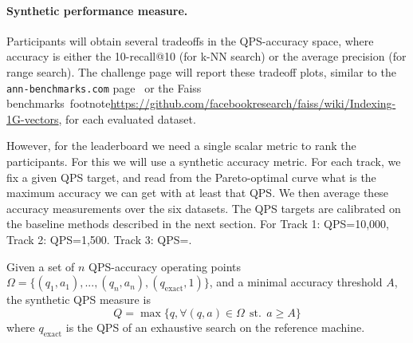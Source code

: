 \fi




\paragraph{Synthetic performance measure.}


Participants will obtain several tradeoffs in the QPS-accuracy space,
where accuracy is either the 10-recall@10 (for k-NN search) or the
average precision (for range search).  
The challenge page will report
these tradeoff plots, similar to the {\tt ann-benchmarks.com}
page~\cite{Benchmark} or the Faiss benchmarks~footnote{\url{https://github.com/facebookresearch/faiss/wiki/Indexing-1G-vectors}},
for each evaluated dataset.

However, for the leaderboard we need a single scalar metric to rank the participants. 
For this we will use a synthetic accuracy metric. 
For each track, we fix a given QPS target, and read from the Pareto-optimal curve what is the maximum accuracy we can get with at least that QPS. 
%
We then average these accuracy measurements over the six datasets. 
The QPS targets are calibrated on the baseline methods described in the next section. 
For Track 1: QPS=10,000, Track 2: QPS=1,500. Track 3: QPS=.


\iffalse 

\begin{definition}
  \label{def:syntheticmetric}
  Given a set of $n$ QPS-accuracy operating points $\Omega = \{(q_1, a_1), ..., (q_n, a_n), (q_\mathrm{exact}, 1)\}$, 
  and a minimal accuracy threshold $A$,   the synthetic QPS measure is 
  \[
Q =  \max \{ q, \forall (q, a)\in \Omega \ \ \mathrm{st.}\ \  a\ge A \}
  \]
  where $q_\mathrm{exact}$ is the QPS of an exhaustive search on the reference machine.
\end{definition}


